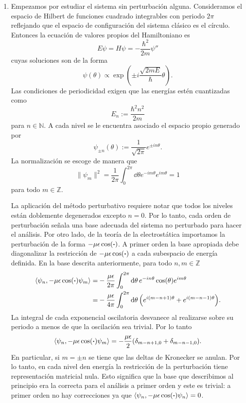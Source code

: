 \documentclass{article}
\begin{document}
\begin{enumerate}[1)]
\item Empezamos por estudiar el sistema sin perturbación alguna.  Consideramos el espacio de Hilbert de funciones cuadrado integrables con periodo $2\pi$ reflejando que el espacio de configuración del sistema clásico es el círculo. Entonces la ecuación de valores propios del Hamiltoniano es
\begin{equation}
E\psi=H\psi=-\frac{\hbar^2}{2m}\psi''
\end{equation} 
cuyas soluciones son de la forma
\begin{equation}
\psi(\theta)\propto \exp(\pm i\frac{\sqrt{2mE}}{\hbar}\theta).
\end{equation}
Las condiciones de periodicidad exigen que las energías estén cuantizadas como
\begin{equation}
E_n:=\frac{\hbar^2 n^2}{2m}
\end{equation}
para $n\in\mathbb{N}$. A cada nivel se le encuentra asociado el espacio propio generado por
\begin{equation}
\psi_{\pm n}(\theta):=\frac{1}{\sqrt{2\pi}}e^{\pm in\theta}.
\end{equation}
La normalización se escoge de manera que
\begin{equation}
\|\psi_m\|^2=\frac{1}{2\pi}\int_0^{2\pi}\dd{\theta} e^{-im\theta}e^{im\theta}=1
\end{equation}
para todo $m\in\mathbb{Z}$.

La aplicación del método perturbativo requiere notar que todos los niveles están doblemente degenerados excepto $n=0$. Por lo tanto, cada orden de perturbación señala una base adecuada del sistema no perturbado para hacer el análisis. Por otro lado, de la teoría de la electrostática importamos la perturbación de la forma $-\mu\epsilon\cos(\vdot)$. A primer orden la base apropiada debe diagonalizar la restricción de $-\mu\epsilon\cos(\vdot)$ a cada subespacio de energía definida. En la base descrita anteriormente, para todo $n,m\in\mathbb{Z}$
\begin{align}
\begin{split}
\langle\psi_n,-\mu\epsilon\cos(\vdot)\psi_m\rangle=&-\frac{\mu\epsilon}{2\pi}\int_0^{2\pi}\dd{\theta}e^{-in\theta}\cos(\theta)e^{im\theta}\\
=&-\frac{\mu\epsilon}{4\pi}\int_0^{2\pi}\dd{\theta}\qty(e^{i(m-n+1)\theta}+e^{i(m-n-1)\theta}).
\end{split}
\end{align}
La integral de cada exponencial oscilatoria desvanece al realizarse sobre su periodo a menos de que la oscilación sea trivial. Por lo tanto
\begin{equation}
\langle\psi_n,-\mu\epsilon\cos(\vdot)\psi_m\rangle=-\frac{\mu\epsilon}{2}\qty(\delta_{m-n+1,0}+\delta_{m-n-1,0}).
\end{equation}
En particular, si $m=\pm n$ se tiene que las deltas de Kronecker se anulan. Por lo tanto, en cada nivel den energía la restricción de la perturbación tiene representación matricial nula. Esto significa que la base que describimos al principio era la correcta para el análisis a primer orden y este es trivial: a primer orden no hay correcciones ya que $\langle\psi_n,-\mu\epsilon\cos(\vdot)\psi_n\rangle=0$.


\end{enumerate}
\end{document}
